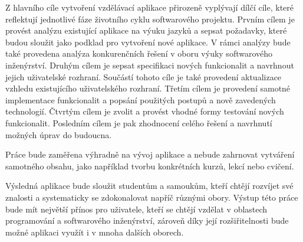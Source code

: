 Z hlavního cíle vytvoření vzdělávací aplikace přirozeně vyplývají dílčí cíle, které reflektují jednotlivé fáze životního cyklu softwarového projektu. Prvním cílem je provést analýzu existující aplikace na výuku jazyků a sepsat požadavky, které budou sloužit jako podklad %
pro vytvoření nové aplikace. V rámci analýzy bude také provedena analýza konkurenčních řešení v oboru výuky softwarového inženýrství. Druhým cílem je sepsat specifikaci nových funkcionalit a navrhnout jejich uživatelské rozhraní. Součástí tohoto cíle je také provedení aktualizace vzhledu existujícího uživatelského rozhraní. Třetím cílem je provedení samotné implementace funkcionalit a popsání použitých postupů a nově zavedených technologií. Čtvrtým cílem je zvolit a provést vhodné formy testování nových funkcionalit. Posledním cílem je pak zhodnocení celého řešení a navrhnutí možných úprav do budoucna.

Práce bude zaměřena výhradně na vývoj aplikace a nebude zahrnovat vytváření samotného obsahu, jako například tvorbu konkrétních kurzů, lekcí nebo cvičení.

Výsledná aplikace bude sloužit studentům a samoukům, kteří chtějí rozvíjet své znalosti a systematicky se zdokonalovat napříč různými obory. Výstup této práce bude mít největší přínos pro uživatele, kteří se chtějí vzdělat v oblastech programování a softwarového inženýrství, zároveň díky její rozšiřitelnosti bude možné aplikaci využít i v mnoha dalších oborech.

